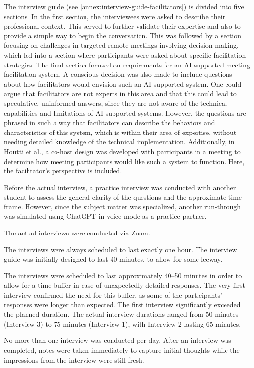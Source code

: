 The interview guide (see \autoref{annex:interview-guide-facilitators}) is divided into five sections. In the
first section, the interviewees were asked to describe their professional context. This served to further
validate their expertise and also to provide a simple way to begin the conversation.
This was followed by a section focusing on challenges in targeted remote meetings involving decision-making,
which led into a section where participants were asked about specific facilitation strategies. The final
section focused on requirements for an AI-supported meeting facilitation system.
A conscious decision was also made to include questions about how facilitators would envision such an
AI-supported system. One could argue that facilitators are not experts in this area and that this could lead
to speculative, uninformed answers, since they are not aware of the technical capabilities and limitations of
AI-supported systems.
However, the questions are phrased in such a way that facilitators can describe the behaviors and
characteristics of this system, which is within their area of expertise, without needing detailed knowledge
of the technical implementation. Additionally, in Houtti et al., a co-host design was developed with
participants in a meeting to determine how meeting participants would like such a system to function. Here,
the facilitator’s perspective is included.

Before the actual interview, a practice interview was conducted with another student to assess the general
clarity of the questions and the approximate time frame. However, since the subject matter was specialized,
another run-through was simulated using ChatGPT in voice mode as a practice partner.

The actual interviews were conducted via Zoom.

The interviews were always scheduled to last exactly one hour. The interview guide was initially designed to
last 40 minutes, to allow for some leeway.

The interviews were scheduled to last approximately 40–50 minutes in order to allow for a time buffer in case
of unexpectedly detailed responses. The very first interview confirmed the need for this buffer, as some of
the participants’ responses were longer than expected. The first interview significantly exceeded the planned
duration. The actual interview durations ranged from 50 minutes (Interview 3) to 75 minutes (Interview 1),
with Interview 2 lasting 65 minutes.

No more than one interview was conducted per day. After an interview was completed, notes were taken
immediately to capture initial thoughts while the impressions from the interview were still fresh.

